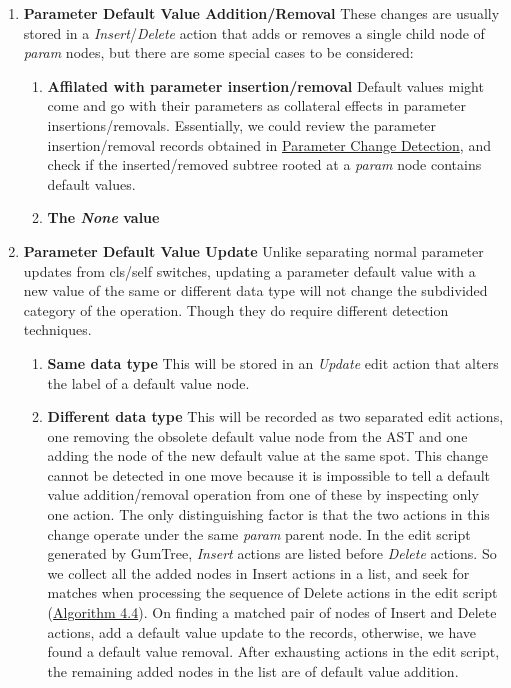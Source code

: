 \begin{enumerate}
	\item \textbf{Parameter Default Value Addition/Removal} These changes are usually stored in a \textit{Insert}/\textit{Delete} action that adds or removes a single child node of \textit{param} nodes, but there are some special cases to be considered:
	\begin{enumerate}
		\item \textbf{Affilated with parameter insertion/removal} Default values might come and go with their parameters as collateral effects in parameter insertions/removals. Essentially, we could review the parameter insertion/removal records obtained in \hyperref[subsec:param-change-detect]{Parameter Change Detection}, and check if the inserted/removed subtree rooted at a \textit{param} node contains default values.
		\item \textbf{The \textit{None} value}
	\end{enumerate}
	\item \textbf{Parameter Default Value Update} Unlike separating normal parameter updates from cls/self switches, updating a parameter default value with a new value of the same or different data type will not change the subdivided category of the operation. Though they do require different detection techniques.
	\begin{enumerate}
		\item \textbf{Same data type} This will be stored in an \textit{Update} edit action that alters the label of a default value node.
		\item \textbf{Different data type} This will be recorded as two separated edit actions, one removing the obsolete default value node from the AST and one adding the node of the new default value at the same spot. This change cannot be detected in one move because it is impossible to tell a default value addition/removal operation from one of these by inspecting only one action. The only distinguishing factor is that the two actions in this change operate under the same \textit{param} parent node. In the edit script generated by GumTree, \textit{Insert} actions are listed before \textit{Delete} actions. So we collect all the added nodes in Insert actions in a list, and seek for matches when processing the sequence of Delete actions in the edit script (\hyperref[algo:check-param-update-remove]{Algorithm 4.4}). On finding a matched pair of nodes of Insert and Delete actions, add a default value update to the records, otherwise, we have found a default value removal. After exhausting actions in the edit script, the remaining added nodes in the list are of default value addition.
	\end{enumerate}
\end{enumerate}

